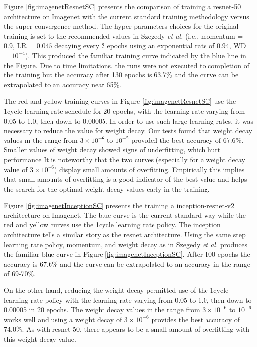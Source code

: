 \documentclass{article} %
\newcommand{\etal}{\emph{et al. }}
\begin{document}
Figure \ref{fig:imagenetResnetSC} presents the comparison of training a resnet-50 architecture on Imagenet with the current standard training methodology versus the super-convergence method.  The hyper-parameters choices for the original training is set to the recommended values in Szegedy \etal \cite{szegedy2017inception} (i.e., momentum = 0.9, LR = 0.045 decaying every 2 epochs using an exponential rate of 0.94, WD = $10^{-4}$).  This produced the familiar training curve indicated by the blue line in the Figure.    Due to time limitations, the runs were not executed to completion of the training but the accuracy after 130 epochs is 63.7\% and the curve can be extrapolated to an accuracy near 65\%.

The red and yellow training curves in Figure \ref{fig:imagenetResnetSC} use the 1cycle learning rate schedule for 20 epochs, with the learning rate varying from 0.05 to 1.0, then down to 0.00005.  In order to use such large learning rates, it was necessary to reduce the value for weight decay.  Our tests found that weight decay values in the range from $3 \times 10^{-6}$ to $10^{-5}$ provided the best accuracy of $67.6\%$. Smaller values of weight decay showed signs of underfitting, which hurt performance  It is noteworthy that the two curves (especially for a weight decay value of $3 \times 10^{-6}$) display small amounts of overfitting.  Empirically this implies that small amounts of overfitting is a good indicator of the best value and helps the search for the optimal weight decay values early in the training.

Figure \ref{fig:imagenetInceptionSC} presents the training a inception-resnet-v2 architecture on Imagenet.  The blue curve is the current standard way while the red and yellow curves use the 1cycle learning rate policy.  The inception architecture tells a similar story as the resnet architecture.  Using the same step learning rate policy, momentum, and weight decay as in Szegedy \etal \cite{szegedy2017inception} produces the familiar blue curve in Figure \ref{fig:imagenetInceptionSC}.  After 100 epochs the accuracy is 67.6\% and the curve can be extrapolated to an accuracy in the range of 69-70\%.

On the other hand, reducing the weight decay permitted use of the 1cycle learning rate policy with the learning rate varying from 0.05 to 1.0, then down to 0.00005 in 20 epochs.  The weight decay values in the range from $3 \times 10^{-6}$ to $10^{-6}$ works well and  using a weight decay of $3 \times 10^{-6}$ provides the best accuracy of $ 74.0\%$.  As with resnet-50, there appears to be a small amount of overfitting with this weight decay value. 
\end{document}
